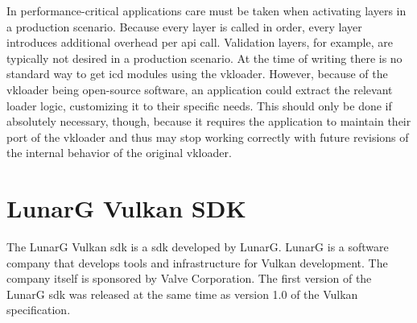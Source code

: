     In performance-critical applications care must be taken when activating layers in a production scenario.
    Because every layer is called in order, every layer introduces additional overhead per \gls{api} call.
    Validation layers, for example, are typically not desired in a production scenario.
    At the time of writing there is no standard way to get \gls{icd} modules using the \gls{vkloader}.
    However, because of the \gls{vkloader} being open-source software, an application could extract the relevant loader logic, customizing it to their specific needs.
    This should only be done if absolutely necessary, though, because it requires the application to maintain their port of the \gls{vkloader} and thus may stop working correctly with future revisions of the internal behavior of the original \gls{vkloader}.










  \section{LunarG Vulkan SDK}
  \label{sec:LunarGSDK}
    The LunarG Vulkan \gls{sdk}\cite{lunargvulkansdk} is a \acrlong{sdk} developed by LunarG.
    LunarG is a software company that develops tools and infrastructure for Vulkan development.
    The company itself is sponsored by Valve Corporation.
    The first version of the LunarG \gls{sdk} was released at the same time as version 1.0 of the Vulkan specification.


